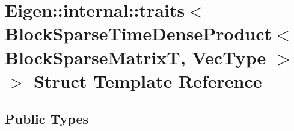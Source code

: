 \hypertarget{struct_eigen_1_1internal_1_1traits_3_01_block_sparse_time_dense_product_3_01_block_sparse_matrix_t_00_01_vec_type_01_4_01_4}{}\section{Eigen\+:\+:internal\+:\+:traits$<$ Block\+Sparse\+Time\+Dense\+Product$<$ Block\+Sparse\+MatrixT, Vec\+Type $>$ $>$ Struct Template Reference}
\label{struct_eigen_1_1internal_1_1traits_3_01_block_sparse_time_dense_product_3_01_block_sparse_matrix_t_00_01_vec_type_01_4_01_4}
\subsection*{Public Types}

